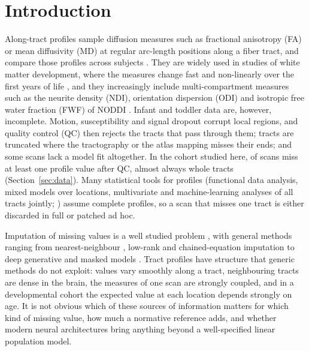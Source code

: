 \documentclass[11pt]{article}
\begin{document}
\section{Introduction}

Along-tract profiles sample diffusion measures such as fractional anisotropy (FA) or mean diffusivity (MD) at
regular arc-length positions along a fiber tract, and compare those profiles across subjects
\citep{goodlett2009group,colby2012alongtract,yeatman2012afq,verde2014unc,chandio2020buan}. They are widely used in
studies of white matter development, where the measures change fast and non-linearly over the first years of life
\citep{geng2012tract,dubois2014early,lebel2018development,ouyang2019delineation,stephens2020wm}, and they increasingly
include multi-compartment measures such as the neurite density (NDI), orientation dispersion (ODI) and isotropic free
water fraction (FWF) of NODDI \citep{zhang2012noddi,dean2017onemonth}. Infant and toddler data are, however,
incomplete. Motion, susceptibility and signal dropout corrupt local regions, and quality control (QC) then rejects
the tracts that pass through them; tracts are truncated where the tractography or the atlas mapping misses their ends;
and some scans lack a model fit altogether. In the cohort studied here, \missScansAny{} of \bcpscans{} scans miss at
least one profile value after QC, almost always whole tracts (Section~\ref{sec:data}). Many statistical tools for
profiles (functional data analysis, mixed models over locations, multivariate and machine-learning analyses of all
tracts jointly; \citealp{chamberland2019dimensionality,richiehalford2021afqinsight}) assume complete profiles, so a scan
that misses one tract is either discarded in full or patched ad hoc.

Imputation of missing values is a well studied problem \citep{rubin1976inference,little2019missing}, with general
methods ranging from nearest-neighbour \citep{troyanskaya2001knn}, low-rank \citep{mazumder2010softimpute} and
chained-equation \citep{vanbuuren2011mice} imputation to deep generative and masked models
\citep{yoon2018gain,mattei2019miwae,ma2019eddi,du2024remasker}. Tract profiles have structure that generic methods do
not exploit: values vary smoothly along a tract, neighbouring tracts are dense in the brain, the measures of one scan
are strongly coupled, and in a developmental cohort the expected value at each location depends strongly on age. It is
not obvious which of these sources of information matters for which kind of missing value, how much a normative
reference adds, and whether modern neural architectures bring anything beyond a well-specified linear population
model.
\end{document}
